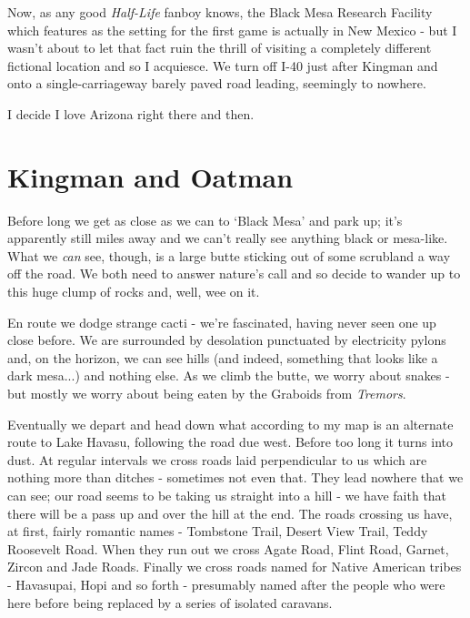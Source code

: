 \documentclass[a5paper,titlepage,11pt]{book}
\begin{document}
Now, as any good \emph{Half-Life} fanboy knows, the Black Mesa Research Facility which features as the setting for the first game is actually in New Mexico - but I wasn't about to let that fact ruin the thrill of visiting a completely different fictional location and so I acquiesce. We turn off I-40 just after Kingman and onto a single-carriageway barely paved road leading, seemingly to nowhere.

I decide I love Arizona right there and then.

\section*{Kingman and Oatman}

Before long we get as close as we can to `Black Mesa' and park up; it's apparently still miles away and we can't really see anything black or mesa-like. What we \emph{can} see, though, is a large butte sticking out of some scrubland a way off the road. We both need to answer nature's call and so decide to wander up to this huge clump of rocks and, well, wee on it.


En route we dodge strange cacti - we're fascinated, having never seen one up close before. We are surrounded by desolation punctuated by electricity pylons and, on the horizon, we can see hills (and indeed, something that looks like a dark mesa...) and nothing else. As we climb the butte, we worry about snakes - but mostly we worry about being eaten by the Graboids from \emph{Tremors}.

Eventually we depart and head down what according to my map is an alternate route to Lake Havasu, following the road due west. Before too long it turns into dust. At regular intervals we cross roads laid perpendicular to us which are nothing more than ditches - sometimes not even that. They lead nowhere that we can see; our road seems to be taking us straight into a hill - we have faith that there will be a pass up and over the hill at the end. The roads crossing us have, at first, fairly romantic names - Tombstone Trail, Desert View Trail, Teddy Roosevelt Road. When they run out we cross Agate Road, Flint Road, Garnet, Zircon and Jade Roads. Finally we cross roads named for Native American tribes - Havasupai, Hopi and so forth - presumably named after the people who were here before being replaced by a series of isolated caravans.
\end{document}
